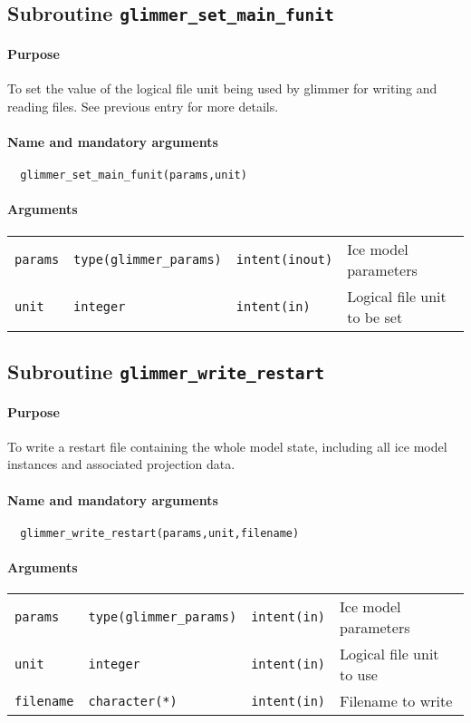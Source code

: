 \subsection{Subroutine \texttt{glimmer\_set\_main\_funit}}
%
\paragraph{Purpose}
%
To set the value of the logical file unit being used by glimmer for writing
and reading files. See previous entry for more details.
%
\paragraph{Name and mandatory arguments}
%
\begin{verbatim}
  glimmer_set_main_funit(params,unit)
\end{verbatim}
%
\paragraph{Arguments}
%
\begin{center}
\begin{tabular}{llll}
\texttt{params} & \texttt{type(glimmer\_params)} & \texttt{intent(inout)} &
Ice model parameters \\
\texttt{unit} & \texttt{integer} & \texttt{intent(in)} & Logical file unit to
be set \\
\end{tabular}
\end{center}
%
\subsection{Subroutine \texttt{glimmer\_write\_restart}}
%
\paragraph{Purpose}
%
To write a restart file containing the whole model state, including all ice
model instances and associated projection data.
%
\paragraph{Name and mandatory arguments}
%
\begin{verbatim}
  glimmer_write_restart(params,unit,filename)
\end{verbatim}
%
\paragraph{Arguments}
%
\begin{center}
\begin{tabular}{llll}
\texttt{params} & \texttt{type(glimmer\_params)} & \texttt{intent(in)} &
Ice model parameters \\
\texttt{unit} & \texttt{integer} & \texttt{intent(in)} & Logical file unit to
use \\
\texttt{filename} & \texttt{character(*)} & \texttt{intent(in)} & Filename to
write \\
\end{tabular}
\end{center}
%
